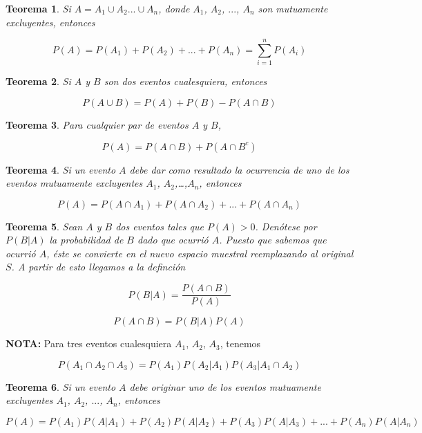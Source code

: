 \documentclass[
]{book}
\newtheorem{theorem}{Teorema}[chapter]
\theoremstyle{definition}
\theoremstyle{definition}
\theoremstyle{definition}
\theoremstyle{definition}
\theoremstyle{remark}
\begin{document}
\begin{theorem}
\protect\hypertarget{thm:TMA1-5}{}{\label{thm:TMA1-5} }Si \(A=A_1\cup A_2... \cup A_n\), donde \(A_1\), \(A_2\), \(...\), \(A_n\) son mutuamente excluyentes, entonces

\[P(A)=P(A_1)+P(A_2)+...+P(A_n)=\sum_{i=1}^{n}P(A_i)\]
\end{theorem}

\begin{theorem}
\protect\hypertarget{thm:TMA1-6}{}{\label{thm:TMA1-6} }Si \(A\) y \(B\) son dos eventos cualesquiera, entonces

\[P(A \cup B)= P(A)+P(B)- P(A \cap B)\]
\end{theorem}

\begin{theorem}
\protect\hypertarget{thm:TMA1-7}{}{\label{thm:TMA1-7} }Para cualquier par de eventos \(A\) y \(B\),

\[P(A)=P(A \cap B)+P(A \cap B^{c})\]
\end{theorem}

\begin{theorem}
\protect\hypertarget{thm:TMA1-8}{}{\label{thm:TMA1-8} }Si un evento \(A\) debe dar como resultado la ocurrencia de uno de los eventos mutuamente excluyentes \(A_1\), \(A_2\),\ldots,\(A_n\), entonces

\[P(A)=P(A \cap A_1)+P(A \cap A_2) +...+ P(A \cap A_n)\]
\end{theorem}

\begin{theorem}
\protect\hypertarget{thm:TMA1-9}{}{\label{thm:TMA1-9} }Sean \(A\) y \(B\) dos eventos tales que \(P(A)>0\). Denótese por \(P(B|A)\) la probabilidad de \(B\) dado que ocurrió \(A\). Puesto que sabemos que ocurrió \(A\), éste se convierte en el nuevo espacio muestral reemplazando al original \(S\). A partir de esto llegamos a la definción

\[P(B|A)=\dfrac{P(A\cap B)}{P(A)}\]

\[P(A\cap B)=P(B|A)P(A)\]
\end{theorem}

\textbf{NOTA:} Para tres eventos cualesquiera \(A_1\), \(A_2\), \(A_3\), tenemos

\[P(A_1 \cap A_2 \cap A_3)=P(A_1)P(A_2|A_1)P(A_3| A_1 \cap A_2)\]

\begin{theorem}
\protect\hypertarget{thm:TMA1-10}{}{\label{thm:TMA1-10} }Si un evento \(A\) debe originar uno de los eventos mutuamente excluyentes \(A_1\), \(A_2\), \(...\), \(A_n\), entonces

\[P(A)=P(A_1)P(A|A_1)+P(A_2)P(A|A_2)+P(A_3)P(A|A_3)+...+P(A_n)P(A|A_n)\]
\end{theorem}
\end{document}
